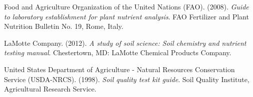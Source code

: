 \vspace{6pt}
\noindent Food and Agriculture Organization of the United Nations (FAO). (2008). \textit{Guide to laboratory establishment for plant nutrient analysis}. FAO Fertilizer and Plant Nutrition Bulletin No. 19, Rome, Italy.

\vspace{6pt}
\noindent LaMotte Company. (2012). \textit{A study of soil science: Soil chemistry and nutrient testing manual}. Chestertown, MD: LaMotte Chemical Products Company.

\vspace{6pt}
\noindent United States Department of Agriculture - Natural Resources Conservation Service (USDA-NRCS). (1998). \textit{Soil quality test kit guide}. Soil Quality Institute, Agricultural Research Service.
